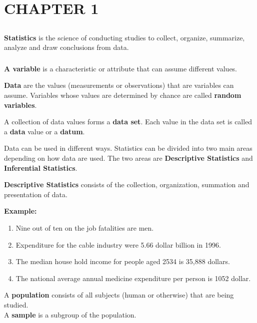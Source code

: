 \documentclass[12pt,a4paper,openany]{book}
\begin{document}
\chapter*{CHAPTER 1}
 
\section{}

\textbf{Statistics} is the science of conducting 
studies to collect, organize, summarize, analyze and 
draw conclusions from data.

\subsection{}

\textbf{A variable} is a characteristic or attribute 
that can assume different values.

\textbf{Data }are the values (measurements or observations) 
that are variables can assume. Variables whose values are 
determined by chance are called \textbf{random variables}.

A collection of data values forms a \textbf{data set}. 
Each value in the data set is called a \textbf{data} 
value or a \textbf{datum}.

Data can be used in different ways. Statistics can be 
divided into two main areas depending on how data are used. 
The two areas are \textbf{Descriptive Statistics} 
and \textbf{Inferential Statistics}.

\textbf{Descriptive Statistics} consists of the collection, 
organization, summation and presentation of data.

\textbf{Example:}
\begin{enumerate}
\item Nine out of ten on the job fatalities are men.
\item Expenditure for the cable industry were 5.66 
      dollar billion in 1996.
\item The median house hold income for people aged 2534 
      is 35,888 dollars.
\item The national average annual medicine 
      expenditure per person is 1052 dollar.
\end{enumerate}

\begin{mdframed}
A \textbf{population} consists of all subjects 
(human or otherwise) that are being studied.
\\
A \textbf{sample} is a subgroup of the population.
\end{mdframed}
\end{document}
